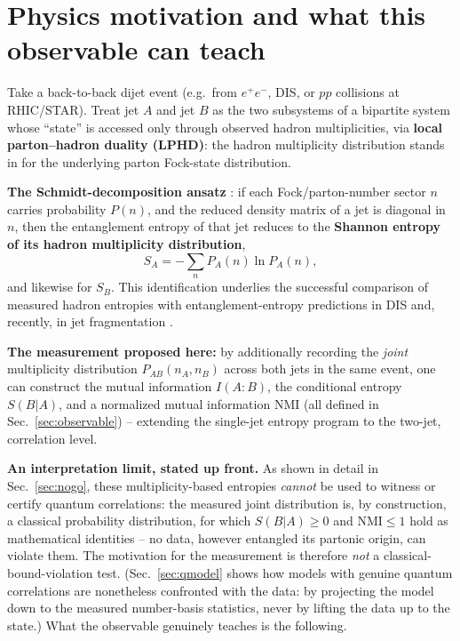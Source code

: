 \documentclass[11pt]{article}
\newcommand{\SBA}{S(B|A)}
\newcommand{\NMI}{\mathrm{NMI}}
\begin{document}
\tableofcontents

\section{Physics motivation and what this observable can teach}
\label{sec:motivation}

Take a back-to-back dijet event (e.g.\ from $e^+e^-$, DIS, or $pp$
collisions at RHIC/STAR). Treat jet $A$ and jet $B$ as the two subsystems
of a bipartite system whose ``state'' is accessed only through observed
hadron multiplicities, via \textbf{local parton--hadron duality (LPHD)}:
the hadron multiplicity distribution stands in for the underlying parton
Fock-state distribution.

\textbf{The Schmidt-decomposition ansatz}
\cite{KL2017,PS2016}: if each Fock/parton-number sector $n$ carries
probability $P(n)$, and the reduced density matrix of a jet is diagonal in
$n$, then the entanglement entropy of that jet reduces to the
\textbf{Shannon entropy of its hadron multiplicity distribution},
\begin{equation}
S_A = -\sum_n P_A(n)\ln P_A(n),
\end{equation}
and likewise for $S_B$. This identification underlies the successful
comparison of measured hadron entropies with entanglement-entropy
predictions in DIS \cite{TKU2020,H1_2021} and, recently, in jet
fragmentation \cite{Datta2025}.

\textbf{The measurement proposed here:} by additionally recording the
\emph{joint} multiplicity distribution $P_{AB}(n_A,n_B)$ across both jets
in the same event, one can construct the mutual information $I(A{:}B)$,
the conditional entropy $\SBA$, and a normalized mutual information
$\NMI$ (all defined in Sec.~\ref{sec:observable}) -- extending the
single-jet entropy program to the two-jet, correlation level.

\textbf{An interpretation limit, stated up front.} As shown in detail in
Sec.~\ref{sec:nogo}, these multiplicity-based entropies \emph{cannot} be
used to witness or certify quantum correlations: the measured joint
distribution is, by construction, a classical probability distribution,
for which $\SBA\geq0$ and $\NMI\leq1$ hold as mathematical identities --
no data, however entangled its partonic origin, can violate them. The
motivation for the measurement is therefore \emph{not} a
classical-bound-violation test. (Sec.~\ref{sec:qmodel} shows how models
with genuine quantum correlations are nonetheless confronted with the
data: by projecting the model down to the measured number-basis
statistics, never by lifting the data up to the state.) What the
observable genuinely teaches is the following.
\end{document}
